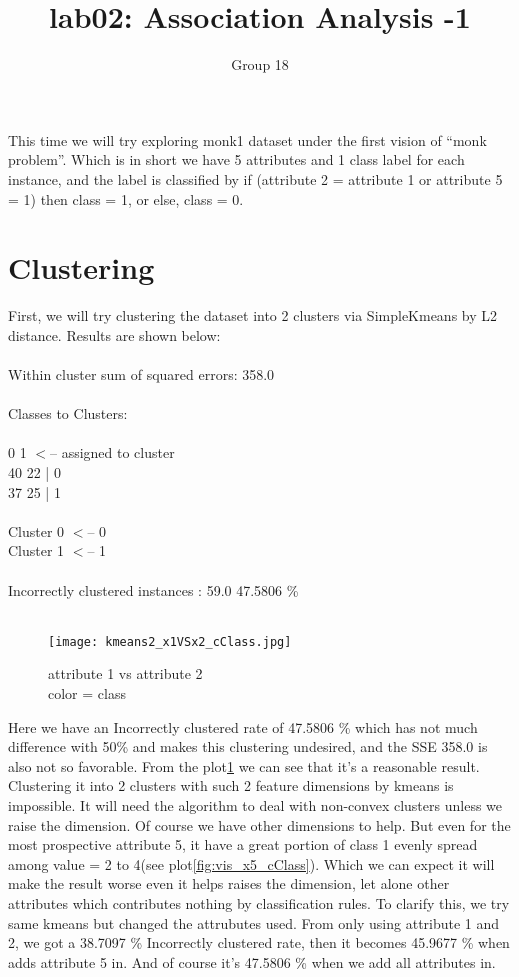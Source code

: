 \documentclass{article}
\title{lab02: Association Analysis -1}
\author{Group 18}
\begin{document}
\maketitle

This time we will try exploring monk1 dataset under the first vision of “monk problem”. Which is in short we have 5 attributes and 1 class label for each instance, and the label is classified by if (attribute 2 = attribute 1 or attribute 5 = 1) then class = 1, or else, class = 0.
\section{Clustering}

First, we will try clustering the dataset into 2 clusters via SimpleKmeans by L2 distance. Results are shown below:\\
\\
Within cluster sum of squared errors: 358.0 \\
\\
Classes to Clusters:\\
\\
  0  1  $<$-- assigned to cluster\\
 40 22 | 0\\
 37 25 | 1\\
\\
Cluster 0 $<$-- 0\\
Cluster 1 $<$-- 1\\
\\
Incorrectly clustered instances :	59.0	 47.5806 \% \\
\\

\begin{figure}[H]
\centering
\texttt{[image: kmeans2\_x1VSx2\_cClass.jpg]}
\caption{\label{fig:kmeans2_x1VSx2_cClass}attribute 1 vs attribute 2 \\ color = class}
\end{figure}

Here we have an Incorrectly clustered rate of 47.5806 \% which has not much difference with 50\% and makes this clustering undesired, and the SSE 358.0 is also not so favorable. From the plot\ref{fig:kmeans2_x1VSx2_cClass} we can see that it’s a reasonable result. Clustering it into 2 clusters with such 2 feature dimensions by kmeans is impossible. It will need the algorithm to deal with non-convex clusters unless we raise the dimension.  Of course we have other dimensions to help. But even for the most prospective attribute 5, it have a great portion of class 1 evenly spread among value = 2 to 4(see plot\ref{fig:vis_x5_cClass}). Which we can expect it will make the result worse even it helps raises the dimension, let alone other attributes which contributes nothing by classification rules. To clarify this, we try same kmeans but changed the attrubutes used. From only using attribute 1 and 2, we got a 38.7097 \% Incorrectly clustered rate, then it becomes 45.9677 \% when adds attribute 5 in. And of course it’s 47.5806 \% when we add all attributes in.
\end{document}
